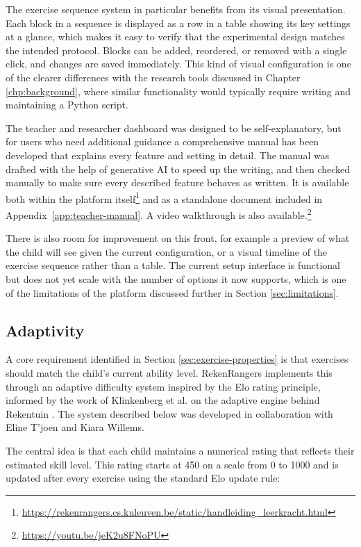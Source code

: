 The exercise sequence system in particular benefits from its visual presentation. Each block in a sequence is displayed as a row in a table showing its key settings at a glance, which makes it easy to verify that the experimental design matches the intended protocol. Blocks can be added, reordered, or removed with a single click, and changes are saved immediately. This kind of visual configuration is one of the clearer differences with the research tools discussed in Chapter \ref{chp:background}, where similar functionality would typically require writing and maintaining a Python script.

The teacher and researcher dashboard was designed to be self-explanatory, but for users who need additional guidance a comprehensive manual has been developed that explains every feature and setting in detail. The manual was drafted with the help of generative AI to speed up the writing, and then checked manually to make sure every described feature behaves as written. It is available both within the platform itself\footnote{\url{https://rekenrangers.cs.kuleuven.be/static/handleiding_leerkracht.html}} and as a standalone document included in Appendix~\ref{app:teacher-manual}. A video walkthrough is also available.\footnote{\url{https://youtu.be/jeK2u8FNoPU}}

There is also room for improvement on this front, for example a preview of what the child will see given the current configuration, or a visual timeline of the exercise sequence rather than a table. The current setup interface is functional but does not yet scale with the number of options it now supports, which is one of the limitations of the platform discussed further in Section \ref{sec:limitations}.

\subsection{Adaptivity}
\label{sec:adaptivity}
A core requirement identified in Section \ref{sec:exercise-properties} is that exercises should match the child's current ability level. RekenRangers implements this through an adaptive difficulty system inspired by the Elo rating principle, informed by the work of Klinkenberg et al. on the adaptive engine behind Rekentuin \cite{klinkenberg2011computer}. The system described below was developed in collaboration with Eline T'joen and Kiara Willems.

The central idea is that each child maintains a numerical rating that reflects their estimated skill level. This rating starts at 450 on a scale from 0 to 1000 and is updated after every exercise using the standard Elo update rule:

